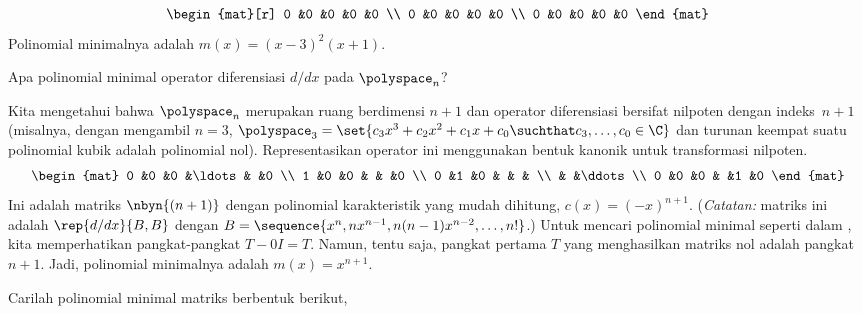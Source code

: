 \begin{exercises}
\begin{answer}
\begin{exparts}
\begin{multline*}
\begin{aligned}
\begin{mat}[r]
               0   &0    &0    &0    &0    \\
               0   &0    &0    &0    &0    \\
               0   &0    &0    &0    &0  
           \end{mat}  
           \end{aligned}         
         \end{multline*}
         Polinomial minimalnya adalah \( m(x)=(x-3)^2(x+1) \).
      \end{exparts} 
    \end{answer}
  \recommended \item 
     Apa polinomial minimal operator diferensiasi
     $d/dx$ pada \( \polyspace_n \)?
     \begin{answer}
       Kita mengetahui bahwa $\polyspace_n$ merupakan ruang berdimensi $n+1$ dan
       operator diferensiasi bersifat
       nilpoten dengan indeks~$n+1$ (misalnya, dengan mengambil $n=3$,
       $\polyspace_3=\set{c_3x^3+c_2x^2+c_1x+c_0\suchthat c_3,\ldots,c_0\in\C}$
       dan turunan keempat suatu polinomial kubik adalah polinomial nol).
       Representasikan operator ini menggunakan bentuk kanonik
       untuk transformasi nilpoten.
       \begin{equation*}
         \begin{mat}
           0  &0  &0  &\ldots &  &0  \\
           1  &0  &0  &       &  &0  \\
           0  &1  &0  &       &  &   \\
              &   &\ddots            \\
           0  &0  &0  &       &1 &0 
         \end{mat}
       \end{equation*}
       Ini adalah matriks $\nbyn{(n+1)}$ dengan polinomial
       karakteristik yang mudah dihitung,
        $c(x)=(-x)^{n+1}$.
       (\textit{Catatan:} matriks ini adalah $\rep{d/dx}{B,B}$ dengan
        $B=\sequence{x^n,nx^{n-1},n(n-1)x^{n-2},\ldots,n!}$.)
       Untuk mencari polinomial minimal seperti dalam ,
       kita memperhatikan pangkat-pangkat $T-0I=T$.
       Namun, tentu saja, pangkat pertama $T$ yang menghasilkan matriks nol
       adalah pangkat $n+1$.
       Jadi, polinomial minimalnya adalah \( m(x)=x^{n+1} \).
     \end{answer}
  \recommended \item 
    Carilah polinomial minimal matriks berbentuk berikut,

\end{exercises}
